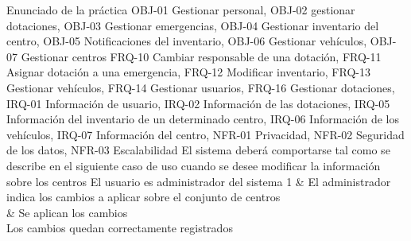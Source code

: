 {\reportauthors}
{Enunciado de la práctica}
{OBJ-01 Gestionar personal, OBJ-02 gestionar dotaciones, OBJ-03 Gestionar emergencias, OBJ-04 Gestionar inventario del centro, OBJ-05 Notificaciones del inventario, OBJ-06 Gestionar vehículos, OBJ-07 Gestionar centros}
{FRQ-10 Cambiar responsable de una dotación, FRQ-11 Asignar dotación a una emergencia, FRQ-12 Modificar inventario, FRQ-13 Gestionar vehículos, FRQ-14 Gestionar usuarios, FRQ-16 Gestionar dotaciones, IRQ-01 Información de usuario, IRQ-02 Información de las dotaciones, IRQ-05 Información del inventario de un determinado centro, IRQ-06 Información de los vehículos, IRQ-07 Información del centro, NFR-01 Privacidad, NFR-02 Seguridad de los datos, NFR-03 Escalabilidad}
{El sistema deberá comportarse tal como se describe en el siguiente caso de uso cuando se desee modificar la información sobre los centros}
{El usuario es administrador del sistema}
{
1 & El administrador indica los cambios a aplicar sobre el conjunto de centros \\  & Se aplican los cambios \\
}
{Los cambios quedan correctamente registrados}
{}

